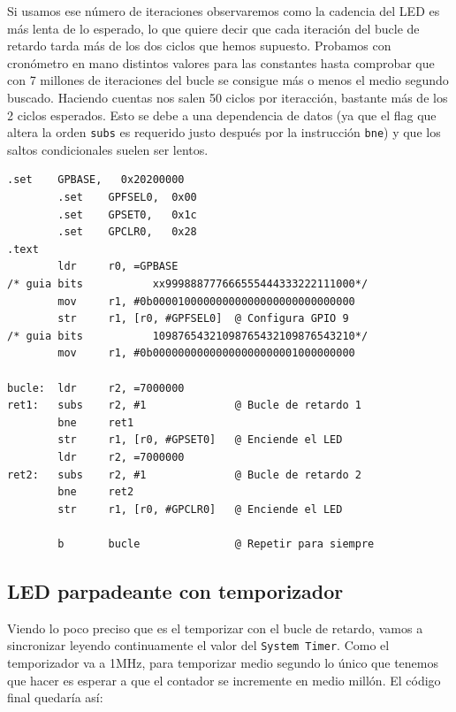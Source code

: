 Si usamos ese número de iteraciones observaremos como la cadencia del
LED es más lenta de lo esperado, lo que quiere decir que cada iteración del bucle
de retardo tarda más de los dos ciclos que hemos supuesto.
Probamos con cronómetro en mano distintos valores para las constantes hasta comprobar que con
7 millones de iteraciones del bucle se consigue más o menos el medio segundo buscado. Haciendo
cuentas nos salen 50 ciclos por iteracción, bastante más de los 2 ciclos esperados. Esto se
debe a una dependencia de datos (ya que el flag que altera
la orden {\tt subs} es requerido justo después por la instrucción {\tt bne}) y que los saltos
condicionales suelen ser lentos.


\begin{lstlisting}[caption={Parte de esbn4.s},label={lst:codigoPract4_4}]
        .set    GPBASE,   0x20200000
        .set    GPFSEL0,  0x00
        .set    GPSET0,   0x1c
        .set    GPCLR0,   0x28
.text
        ldr     r0, =GPBASE
/* guia bits           xx999888777666555444333222111000*/
        mov     r1, #0b00001000000000000000000000000000
        str     r1, [r0, #GPFSEL0]  @ Configura GPIO 9
/* guia bits           10987654321098765432109876543210*/
        mov     r1, #0b00000000000000000000001000000000

bucle:  ldr     r2, =7000000
ret1:   subs    r2, #1              @ Bucle de retardo 1
        bne     ret1
        str     r1, [r0, #GPSET0]   @ Enciende el LED
        ldr     r2, =7000000
ret2:   subs    r2, #1              @ Bucle de retardo 2
        bne     ret2
        str     r1, [r0, #GPCLR0]   @ Enciende el LED

        b       bucle               @ Repetir para siempre
\end{lstlisting}

\subsection{LED parpadeante con temporizador}

Viendo lo poco preciso que es el temporizar con el bucle de retardo, vamos a sincronizar leyendo
continuamente el valor del {\tt System Timer}. Como el temporizador va a 1MHz, para temporizar
medio segundo lo único que tenemos que hacer es esperar a que el contador se incremente en
medio millón. El código final quedaría así:


